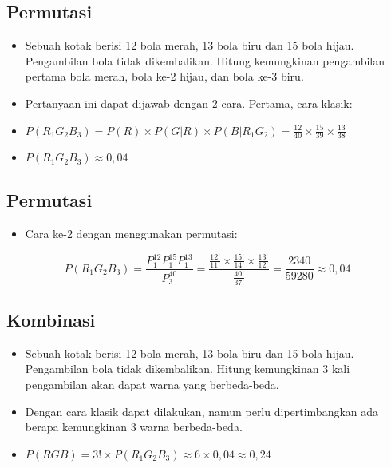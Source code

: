 \documentclass[
  letterpaper,
  DIV=11,
  numbers=noendperiod]{scrartcl}
\providecommand{\tightlist}{%
  \setlength{\itemsep}{0pt}\setlength{\parskip}{0pt}}\usepackage{longtable,booktabs,array}
\begin{document}
\hypertarget{permutasi-1}{%
\subsection{Permutasi}\label{permutasi-1}}

\begin{itemize}
\item
  Sebuah kotak berisi 12 bola merah, 13 bola biru dan 15 bola hijau.
  Pengambilan bola tidak dikembalikan. Hitung kemungkinan pengambilan
  pertama bola merah, bola ke-2 hijau, dan bola ke-3 biru.
\item
  Pertanyaan ini dapat dijawab dengan 2 cara. Pertama, cara klasik:
\item
  \(P(R_1G_2B_3)=P(R) \times P(G|R) \times P(B|R_1G_2)=\frac{12}{40} \times \frac{15}{39} \times \frac{13}{38}\)
\item
  \(P(R_1G_2B_3) \approx 0,04\)
\end{itemize}

\hypertarget{permutasi-2}{%
\subsection{Permutasi}\label{permutasi-2}}

\begin{itemize}
\tightlist
\item
  Cara ke-2 dengan menggunakan permutasi:
\end{itemize}

\[
P(R_1G_2B_3)=\frac{P^{12}_1P^{15}_1P^{13}_1}{P^{40}_3}=\frac{\frac{12!}{11!}\times\frac{15!}{14!}\times\frac{13!}{12!}}{\frac{40!}{37!}}=\frac{2340}{59280} \approx 0,04
\]

\hypertarget{kombinasi-1}{%
\subsection{Kombinasi}\label{kombinasi-1}}

\begin{itemize}
\item
  Sebuah kotak berisi 12 bola merah, 13 bola biru dan 15 bola hijau.
  Pengambilan bola tidak dikembalikan. Hitung kemungkinan 3 kali
  pengambilan akan dapat warna yang berbeda-beda.
\item
  Dengan cara klasik dapat dilakukan, namun perlu dipertimbangkan ada
  berapa kemungkinan 3 warna berbeda-beda.
\item
  \(P(RGB)=3! \times P(R_1G_2B_3)\approx6\times0,04\approx0,24\)
\end{itemize}
\end{document}
